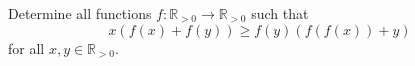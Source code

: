 Determine all functions $f\colon \mathbb{R}_{>0} \rightarrow \mathbb{R}_{>0}$ such that
$$x\left(f(x)+f(y)\right) \ge f(y) \left(f(f(x)) + y\right)$$
for all $x,y\in \mathbb{R}_{>0}$.

